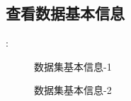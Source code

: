 \documentclass[
12pt, %
UTF8
]{fphw}
\begin{document}
	\subsection{查看数据基本信息}:\\
	\begin{figure}[H]
	\caption{数据集基本信息-1}
	\end{figure}
	\begin{figure}[H]
	\caption{数据集基本信息-2}
	\end{figure}
\end{document}

